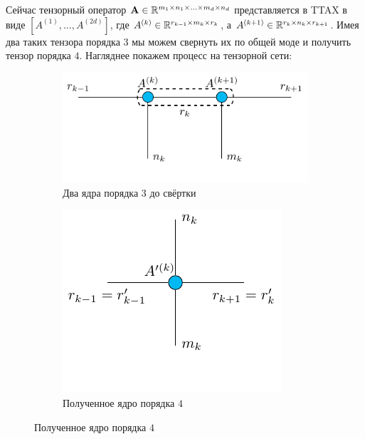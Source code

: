 \documentclass[12pt]{article}
\newcommand{\mbf}{\mathbf}
\begin{document}
    Сейчас тензорный оператор $\mbf{A} \in \RR^{m_1 \times n_1 \times \ldots \times m_d \times n_d}$ представляется в
    TTAX в виде $\left[ A^{(1)}, \ldots, A^{(2d)} \right]$, где $A^{(k)} \in \mathbb{R}^{r_{k - 1} \times m_k \times r_k}$, а
    $A^{(k+1)} \in \mathbb{R}^{r_{k} \times n_k \times r_{k+1}}$. Имея два таких тензора порядка $3$ мы можем свернуть их по общей моде и получить тензор порядка $4$.
    Нагляднее покажем процесс на тензорной сети:
    \begin{figure}[h!]
        \centering
        \begin{subfigure}[b]{0.47\linewidth}
            \includegraphics[width=\linewidth]{./pic/tensornet_operator_2cores}
            \caption{Два ядра порядка $3$ до свёртки}
        \end{subfigure}
        \begin{subfigure}[b]{0.33\linewidth}
            \includegraphics[width=\linewidth]{./pic/tensornet_operator_1core}
            \caption{Полученное ядро порядка $4$}
        \end{subfigure}
    \end{figure}
\end{document}
